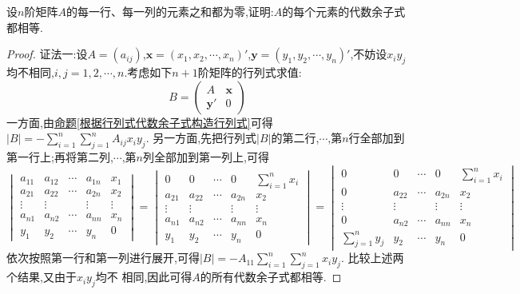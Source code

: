 \documentclass[../../main.tex]{subfiles}%
\begin{document}
\begin{example}
设\(n\)阶矩阵\(A\)的每一行、每一列的元素之和都为零,证明:\(A\)的每个元素的代数余子式都相等.
\end{example}
\begin{proof}

{\color{blue}证法一:}设\(A=(a_{ij})\),\(\boldsymbol{x}=(x_1,x_2,\cdots,x_n)'\),\(\boldsymbol{y}=(y_1,y_2,\cdots,y_n)'\),不妨设$x_iy_j$均不相同,$i,j=1,2,\cdots,n$.考虑如下\(n + 1\)阶矩阵的行列式求值:
\[
B=\begin{pmatrix}
A & \boldsymbol{x}\\
\boldsymbol{y}' & 0
\end{pmatrix}
\]
一方面,由\hyperref[根据行列式代数余子式构造行列式]{命题\ref{根据行列式代数余子式构造行列式}}可得\(|B|=-\sum_{i = 1}^{n}\sum_{j = 1}^{n}A_{ij}x_iy_j\). 另一方面,先把行列式\(|B|\)的第二行,\(\cdots\),第\(n\)行全部加到第一行上;再将第二列,\(\cdots\),第\(n\)列全部加到第一列上,可得
\[
\begin{vmatrix}
a_{11}&a_{12}&\cdots&a_{1n}&x_1\\
a_{21}&a_{22}&\cdots&a_{2n}&x_2\\
\vdots&\vdots&&\vdots&\vdots\\
a_{n1}&a_{n2}&\cdots&a_{nn}&x_n\\
y_1&y_2&\cdots&y_n&0
\end{vmatrix}=
\begin{vmatrix}
0&0&\cdots&0&\sum_{i = 1}^{n}x_i\\
a_{21}&a_{22}&\cdots&a_{2n}&x_2\\
\vdots&\vdots&&\vdots&\vdots\\
a_{n1}&a_{n2}&\cdots&a_{nn}&x_n\\
y_1&y_2&\cdots&y_n&0
\end{vmatrix}=
\begin{vmatrix}
0&0&\cdots&0&\sum_{i = 1}^{n}x_i\\
0&a_{22}&\cdots&a_{2n}&x_2\\
\vdots&\vdots&&\vdots&\vdots\\
0&a_{n2}&\cdots&a_{nn}&x_n\\
\sum_{j = 1}^{n}y_j&y_2&\cdots&y_n&0
\end{vmatrix}
\]
依次按照第一行和第一列进行展开,可得\(|B|=-A_{11}\sum_{i = 1}^{n}\sum_{j = 1}^{n}x_iy_j\). 比较上述两个结果,又由于$x_iy_j$均不
相同,因此可得\(A\)的所有代数余子式都相等.


\end{proof}
\end{document}
